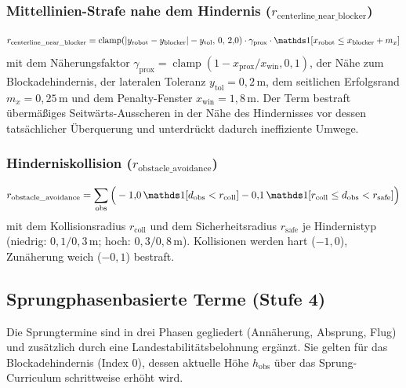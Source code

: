 \subsubsection{Mittellinien-Strafe nahe dem Hindernis ($r_{\text{centerline\_near\_blocker}}$)}
\begin{equation}\label{eq:nav_centerline_penalty}
r_{\text{centerline\_near\_blocker}} = \operatorname{clamp}\!\left(|y_{\text{robot}}-y_{\text{blocker}}| - y_{\text{tol}},\, 0,\, 2{,}0\right)\cdot \gamma_{\text{prox}}\cdot \ind[x_{\text{robot}} \le x_{\text{blocker}}+m_x]
\end{equation}
mit dem Näherungsfaktor $\gamma_{\text{prox}} = \operatorname{clamp}(1 - x_{\text{prox}}/x_{\text{win}},0,1)$, der Nähe zum Blockadehindernis, der lateralen Toleranz $y_{\text{tol}}=0{,}2\,\text{m}$, dem seitlichen Erfolgsrand $m_x=0{,}25\,\text{m}$ und dem Penalty-Fenster $x_{\text{win}}=1{,}8\,\text{m}$. Der Term bestraft übermäßiges Seitwärts-Ausscheren in der Nähe des Hindernisses vor dessen tatsächlicher Überquerung und unterdrückt dadurch ineffiziente Umwege.

\subsubsection{Hinderniskollision ($r_{\text{obstacle\_avoidance}}$)}
\begin{equation}\label{eq:nav_obstacle_avoidance}
r_{\text{obstacle\_avoidance}} = \sum_{\text{obs}} \Big(-1{,}0\,\ind[d_{\text{obs}}<r_{\text{coll}}] - 0{,}1\,\ind[r_{\text{coll}}\le d_{\text{obs}}<r_{\text{safe}}]\Big)
\end{equation}
mit dem Kollisionsradius $r_{\text{coll}}$ und dem Sicherheitsradius $r_{\text{safe}}$ je Hindernistyp (niedrig: $0{,}1/0{,}3\,\text{m}$; hoch: $0{,}3/0{,}8\,\text{m}$). Kollisionen werden hart ($-1{,}0$), Zunäherung weich ($-0{,}1$) bestraft.

\subsection{Sprungphasenbasierte Terme (Stufe 4)}

Die Sprungtermine sind in drei Phasen gegliedert (Annäherung, Absprung, Flug) und zusätzlich durch eine Landestabilitätsbelohnung ergänzt. Sie gelten für das Blockadehindernis (Index $0$), dessen aktuelle Höhe $h_{\text{obs}}$ über das Sprung-Curriculum schrittweise erhöht wird.

